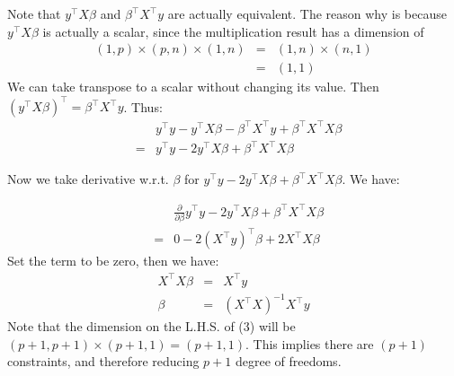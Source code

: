 \documentclass{article}
\theoremstyle{MyNonumberplain}
\theoremstyle{break}
\newcommand{\T}{^\intercal}
\theoremstyle{break}
\begin{document}
\begin{thmbox}
\begin{prfbox}
    Note that $y\T X\beta$ and $\beta\T X\T y$ are actually equivalent. The reason why is because $y\T X\beta$ is actually a scalar, since the multiplication result has a dimension of
    \begin{eqnarray*}
        (1,p) \times (p,n) \times (1,n) &=& (1,n) \times (n,1)\\
                                        &=& (1,1)
    \end{eqnarray*}
    We can take transpose to a scalar without changing its value. Then $(y\T X\beta)\T = \beta\T X\T y$. Thus:
    \begin{eqnarray*}
        & &y\T y - y\T X\beta - \beta\T X\T y + \beta\T X\T X\beta\\
        &=&y\T y - 2y\T X\beta + \beta\T X\T X\beta
    \end{eqnarray*}

    Now we take derivative w.r.t. $\beta$ for $y\T y - 2y\T X\beta + \beta\T X\T X\beta$. We have:


    \end{prfbox}
\end{thmbox} 

\begin{thmbox}
    \begin{prfbox}
        \begin{eqnarray*}
            & &\frac{\partial}{\partial\beta} y\T y - 2y\T X\beta + \beta\T X\T X\beta\\
            &=& 0-2(X\T y)\T\beta+2X\T X\beta
        \end{eqnarray*}   
        Set the term to be zero, then we have:
        \begin{eqnarray}
            X\T X\beta &=& X\T y\\
            \beta &=& (X\T X)^{-1} X\T y
        \end{eqnarray}
        Note that the dimension on the L.H.S. of (3) will be $(p+1,p+1)\times(p+1,1)=(p+1,1)$. This implies there are $(p+1)$ constraints, and therefore reducing $p+1$ degree of freedoms.
    \end{prfbox}
\end{thmbox}
\end{document}
